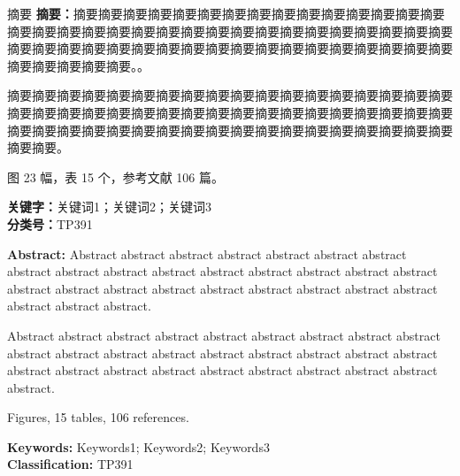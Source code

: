 \documentclass{csuthesis}
\author{作者}
\begin{document}
	\makecoverpage
	
	\newpage
	\frontmatter
	\ifblindreview	%
	\else
	\maketitlepage
	\newpage
	
	\announcement
	\newpage
	\fi

    \begin{abstractcn}
        \noindent
        {\heiti 摘要 \textbf{摘要：}}摘要摘要摘要摘要摘要摘要摘要摘要摘要摘要摘要摘要摘要摘要摘要摘要摘要摘要摘要摘要摘要摘要摘要摘要摘要摘要摘要摘要摘要摘要摘要摘要摘要摘要摘要摘要摘要摘要摘要摘要摘要摘要摘要摘要摘要摘要摘要摘要摘要摘要摘要摘要摘要摘要摘要摘要。。
        
        摘要摘要摘要摘要摘要摘要摘要摘要摘要摘要摘要摘要摘要摘要摘要摘要摘要摘要摘要摘要摘要摘要摘要摘要摘要摘要摘要摘要摘要摘要摘要摘要摘要摘要摘要摘要摘要摘要摘要摘要摘要摘要摘要摘要摘要摘要摘要摘要摘要摘要摘要摘要摘要摘要摘要摘要。
        
        \vspace*{\baselineskip}
        \noindent
        图 23 幅，表 15 个，参考文献 106 篇。
        
		\vspace*{2\baselineskip}
		\noindent
        {\heiti\textbf{关键字：}}关键词1；关键词2；关键词3\\
        {\heiti\textbf{分类号：}}TP391

    \end{abstractcn}

	\begin{abstracten}
		\noindent
		\textbf{Abstract:} Abstract abstract abstract abstract abstract abstract abstract abstract abstract abstract abstract abstract abstract abstract abstract abstract abstract abstract abstract abstract abstract abstract abstract abstract abstract abstract abstract abstract. 
		
		Abstract abstract abstract abstract abstract abstract abstract abstract abstract abstract abstract abstract abstract abstract abstract abstract abstract abstract abstract abstract abstract abstract abstract abstract abstract abstract abstract abstract.
		
		\vspace*{\baselineskip}
		 Figures, 15 tables, 106 references.
		
		\vspace*{2\baselineskip}
		\noindent
		{\textbf{Keywords:}} Keywords1; Keywords2; Keywords3\\
		{\textbf{Classification:}} TP391
	\end{abstracten}
\end{document}
